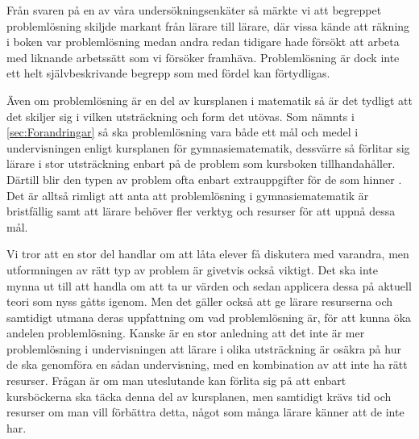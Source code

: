 \textcolor{Mahogany}{Från svaren på en av våra undersökningsenkäter så märkte vi att begreppet problemlösning skiljde markant från lärare till lärare, där vissa kände att räkning i boken var problemlösning medan andra redan tidigare hade försökt att arbeta med liknande arbetssätt som vi försöker framhäva. Problemlösning är dock inte ett helt självbeskrivande begrepp som med fördel kan förtydligas.}

\textcolor{Mahogany}{Även om problemlösning är en del av kursplanen i matematik så är det tydligt att det skiljer sig i vilken utsträckning och form det utövas. Som nämnts i \ref{sec:Forandringar} så ska problemlösning vara både ett mål och medel i undervisningen enligt kursplanen för gymnasiematematik, dessvärre så förlitar sig lärare i stor utsträckning enbart på de problem som kursboken tillhandahåller. Därtill blir den typen av problem ofta enbart extrauppgifter för de som hinner \cite{2010UndervisningenGymnasieskolan}. Det är alltså rimligt att anta att problemlösning i gymnasiematematik är bristfällig samt att lärare behöver fler verktyg och resurser för att uppnå dessa mål.}

\textcolor{Mahogany}{Vi tror att en stor del handlar om att låta elever få diskutera med varandra, men utformningen av rätt typ av problem är givetvis också viktigt. Det ska inte mynna ut till att handla om att ta ur värden och sedan applicera dessa på aktuell teori som nyss gåtts igenom. Men det gäller också att ge lärare resurserna och samtidigt utmana deras uppfattning om vad problemlösning är, för att kunna öka andelen problemlösning.
Kanske är en stor anledning att det inte är mer problemlösning i undervisningen att lärare i olika utsträckning är osäkra på hur de ska genomföra en sådan undervisning, med en kombination av att inte ha rätt resurser. Frågan är om man uteslutande kan förlita sig på att enbart kursböckerna ska täcka denna del av kursplanen, men samtidigt krävs tid och resurser om man vill förbättra detta, något som många lärare känner att de inte har.}